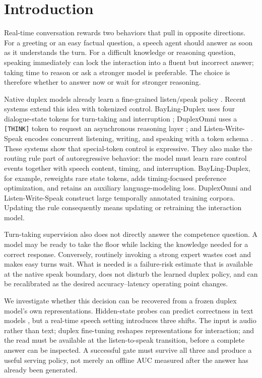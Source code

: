 \section{Introduction}
\label{sec:intro}
Real-time conversation rewards two behaviors that pull in opposite directions.
For a greeting or an easy factual question, a speech agent should answer as
soon as it understands the turn. For a difficult knowledge or reasoning
question, speaking immediately can lock the interaction into a fluent but
incorrect answer; taking time to reason or ask a stronger model is preferable.
The choice is therefore whether to answer now or wait for stronger reasoning.

Native duplex models already learn a fine-grained listen/speak policy
\citep{defossez2024moshi,openbmb2026minicpmo}. Recent systems extend this idea
with tokenized control. BayLing-Duplex uses four dialogue-state tokens for
turn-taking and interruption \citep{bayling2026duplex}; DuplexOmni uses a
\texttt{[THINK]} token to request an asynchronous reasoning layer
\citep{huang2026duplexomni}; and Listen-Write-Speak encodes concurrent
listening, writing, and speaking with a token schema
\citep{zhang2026liberating}. These systems show that special-token control is
expressive. They also make the routing rule part of autoregressive behavior:
the model must learn rare control events together with speech content,
timing, and interruption. BayLing-Duplex, for example, reweights rare state
tokens, adds timing-focused preference optimization, and retains an auxiliary
language-modeling loss. DuplexOmni and Listen-Write-Speak construct large
temporally annotated training corpora. Updating the rule consequently means
updating or retraining the interaction model.

Turn-taking supervision also does not directly answer the competence question.
A model may be ready to take the floor while lacking the knowledge needed for
a correct response. Conversely, routinely invoking a strong expert wastes cost
and makes easy turns wait. What is needed is a failure-risk estimate that is
available at the native speak boundary, does not disturb the learned duplex
policy, and can be recalibrated as the desired accuracy--latency operating point
changes.

We investigate whether this decision can be recovered from a frozen duplex
model's own representations. Hidden-state probes can predict correctness in
text models \citep{azaria2023internal,kossen2024semantic,lugoloobi2026failures},
but a real-time speech setting introduces three shifts. The input is audio
rather than text; duplex fine-tuning reshapes representations for interaction;
and the read must be available at the listen-to-speak transition, before a
complete answer can be inspected. A successful gate must survive all three and
produce a useful serving policy, not merely an offline AUC measured after the
answer has already been generated.

